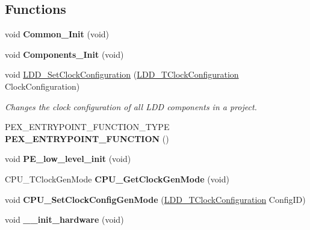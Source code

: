 \subsection*{Functions}
\begin{DoxyCompactItemize}
\item 
void {\bfseries Common\+\_\+\+Init} (void)\hypertarget{group___c_p_u___init__module_ga66dfb9b145f07aaf367bed34ab838e81}{}\label{group___c_p_u___init__module_ga66dfb9b145f07aaf367bed34ab838e81}

\item 
void {\bfseries Components\+\_\+\+Init} (void)\hypertarget{group___c_p_u___init__module_ga2050a66f3a2a54d567b252bc675f82cd}{}\label{group___c_p_u___init__module_ga2050a66f3a2a54d567b252bc675f82cd}

\item 
void \hyperlink{group___c_p_u___init__module_ga7fe8a131453ba765c5e85130a282eafb}{L\+D\+D\+\_\+\+Set\+Clock\+Configuration} (\hyperlink{group___p_e___types__module_ga369bcaf7f00caad5f994c72ac2629a37}{L\+D\+D\+\_\+\+T\+Clock\+Configuration} Clock\+Configuration)
\begin{DoxyCompactList}\small\item\em Changes the clock configuration of all L\+DD components in a project. \end{DoxyCompactList}\item 
P\+E\+X\+\_\+\+E\+N\+T\+R\+Y\+P\+O\+I\+N\+T\+\_\+\+F\+U\+N\+C\+T\+I\+O\+N\+\_\+\+T\+Y\+PE {\bfseries P\+E\+X\+\_\+\+E\+N\+T\+R\+Y\+P\+O\+I\+N\+T\+\_\+\+F\+U\+N\+C\+T\+I\+ON} ()\hypertarget{group___c_p_u___init__module_ga4545e2211c27d105066b8c8eb6609db7}{}\label{group___c_p_u___init__module_ga4545e2211c27d105066b8c8eb6609db7}

\item 
void {\bfseries P\+E\+\_\+low\+\_\+level\+\_\+init} (void)\hypertarget{group___c_p_u___init__module_ga95039f54c45f24c1b4ed640fa2f63f11}{}\label{group___c_p_u___init__module_ga95039f54c45f24c1b4ed640fa2f63f11}

\item 
C\+P\+U\+\_\+\+T\+Clock\+Gen\+Mode {\bfseries C\+P\+U\+\_\+\+Get\+Clock\+Gen\+Mode} (void)\hypertarget{group___c_p_u___init__module_ga08072325fa55f8316916808bf38a1463}{}\label{group___c_p_u___init__module_ga08072325fa55f8316916808bf38a1463}

\item 
void {\bfseries C\+P\+U\+\_\+\+Set\+Clock\+Config\+Gen\+Mode} (\hyperlink{group___p_e___types__module_ga369bcaf7f00caad5f994c72ac2629a37}{L\+D\+D\+\_\+\+T\+Clock\+Configuration} Config\+ID)\hypertarget{group___c_p_u___init__module_ga4a978c61c9083d69ebccbeec10626f94}{}\label{group___c_p_u___init__module_ga4a978c61c9083d69ebccbeec10626f94}

\item 
void {\bfseries \+\_\+\+\_\+init\+\_\+hardware} (void)\hypertarget{group___c_p_u___init__module_ga32a8d86789a3326b3120bf1e1c1d4252}{}\label{group___c_p_u___init__module_ga32a8d86789a3326b3120bf1e1c1d4252}

\end{DoxyCompactItemize}
